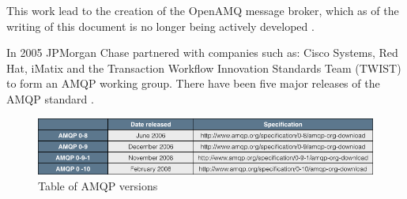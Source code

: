 \documentclass{thesis}
\begin{document}
This work lead to the creation of the OpenAMQ message broker, which as of the writing of this document is no longer being actively developed \cite{OPEN_AMQ}. 

In 2005 JPMorgan Chase partnered with companies such as: Cisco Systems, Red Hat, iMatix and the Transaction Workflow Innovation Standards Team (TWIST) to form an AMQP working group.  There have been five major releases of the AMQP standard \cite{AMQP_SPECS}.

\begin{figure}[h]
\centering
\includegraphics[scale=.5]{amqp_versions}  
\caption{Table of AMQP versions }
\end{figure}

\end{document}
